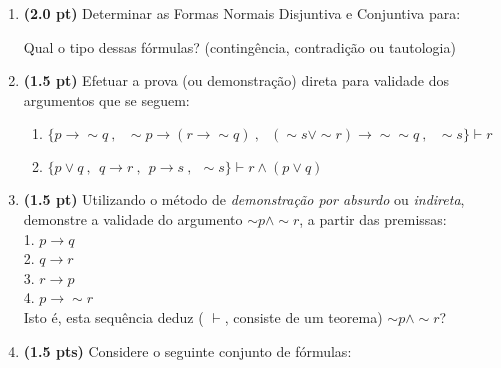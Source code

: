 \documentclass[11pt, a4paper,final]{article}
\begin{document}
\begin{enumerate}

\item {\bf (2.0 pt)} Determinar as Formas Normais Disjuntiva e Conjuntiva para:
Qual o tipo dessas fórmulas? (contingência, contradição ou tautologia)

\item {\bf (1.5 pt)} Efetuar a prova (ou demonstração) direta para validade dos argumentos que se seguem: 
\begin{enumerate}
\item $\{p\rightarrow \sim q \: , \:\:\: \sim p \rightarrow (r \rightarrow \sim q)  \: , \:\:\:
 (\sim s \vee \sim r)\rightarrow \sim \sim q  \: , \:\:\: \sim s  \} \vdash  r $ 
 
\item  $\{ p \vee q \: ,
  \:\: q \rightarrow r \: ,
    \:\: p \rightarrow s \: ,
     \:\: \sim s   \} \vdash r \wedge (p \vee q) $
\end{enumerate}  

\item {\bf (1.5 pt)} Utilizando o método de  {\em demonstração por absurdo} ou {\em indireta},
 demonstre a validade do   argumento $ \sim p \wedge \sim r $, a partir das premissas:\\ 
 
1. $  p \rightarrow  q $ \\
2. $ q \rightarrow r $ \\
3. $ r \rightarrow p $ \\
4. $ p \rightarrow \sim r $ \\
Isto é, esta sequência deduz ( $\vdash $, consiste
de um teorema) $ \sim p \wedge \sim r$?





\item {\bf (1.5 pts)} Considere o seguinte conjunto de f\'ormulas: 


\end{enumerate}
\end{document}
